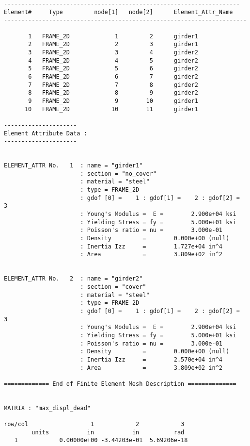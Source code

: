 \begin{footnotesize}
\begin{verbatim}
--------------------------------------------------------------------
Element#     Type         node[1]   node[2]      Element_Attr_Name
----------------------------------------------------------------------

       1   FRAME_2D             1         2      girder1
       2   FRAME_2D             2         3      girder1
       3   FRAME_2D             3         4      girder2
       4   FRAME_2D             4         5      girder2
       5   FRAME_2D             5         6      girder2
       6   FRAME_2D             6         7      girder2
       7   FRAME_2D             7         8      girder2
       8   FRAME_2D             8         9      girder2
       9   FRAME_2D             9        10      girder1
      10   FRAME_2D            10        11      girder1

--------------------- 
Element Attribute Data :        
--------------------- 


ELEMENT_ATTR No.   1  : name = "girder1" 
                      : section = "no_cover" 
                      : material = "steel" 
                      : type = FRAME_2D
                      : gdof [0] =    1 : gdof[1] =    2 : gdof[2] =    3
                      : Young's Modulus =  E =        2.900e+04 ksi
                      : Yielding Stress = fy =        5.000e+01 ksi
                      : Poisson's ratio = nu =        3.000e-01   
                      : Density         =        0.000e+00 (null)
                      : Inertia Izz     =        1.727e+04 in^4
                      : Area            =        3.809e+02 in^2


ELEMENT_ATTR No.   2  : name = "girder2" 
                      : section = "cover" 
                      : material = "steel" 
                      : type = FRAME_2D
                      : gdof [0] =    1 : gdof[1] =    2 : gdof[2] =    3
                      : Young's Modulus =  E =        2.900e+04 ksi
                      : Yielding Stress = fy =        5.000e+01 ksi
                      : Poisson's ratio = nu =        3.000e-01   
                      : Density         =        0.000e+00 (null)
                      : Inertia Izz     =        2.570e+04 in^4
                      : Area            =        3.809e+02 in^2

============= End of Finite Element Mesh Description ==============


MATRIX : "max_displ_dead"

row/col                  1            2            3   
        units           in           in          rad   
   1            0.00000e+00 -3.44203e-01  5.69206e-18


\end{verbatim}
\end{footnotesize}
